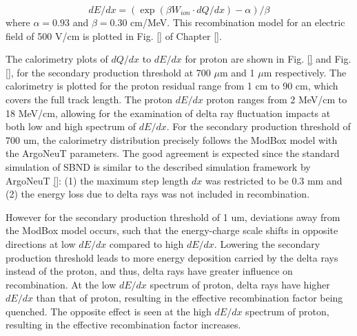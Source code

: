 \begin{equation}
	dE/dx = \left(\exp{\left(\beta W_{ion} \cdot dQ/dx \right)} -\alpha \right)/\beta
\end{equation}
where $\alpha = 0.93$ and $\beta = 0.30$ cm/MeV. 
This recombination model for an electric field of 500 V/cm is plotted in Fig. \ref{} of Chapter \ref{}.

The calorimetry plots of $dQ/dx$ to $dE/dx$ for proton are shown in Fig. \ref{} and Fig. \ref{}, for the secondary production threshold at 700 $\mu$m and 1 $\mu$m respectively.
The calorimetry is plotted for the proton residual range from 1 cm to 90 cm, which covers the full track length. 
The proton $dE/dx$ proton ranges from 2 MeV/cm to 18 MeV/cm, allowing for the examination of delta ray fluctuation impacts at both low and high spectrum of $dE/dx$. 
For the secondary production threshold of 700 um, the calorimetry distribution precisely follows the ModBox model with the ArgoNeuT parameters.
The good agreement is expected since the standard simulation of SBND is similar to the described simulation framework by ArgoNeuT \ref{}: (1) the maximum step length $dx$ was restricted to be 0.3 mm and (2) the energy loss due to delta rays was not included in recombination.

However for the secondary production threshold of 1 um, deviations away from the ModBox model occurs, such that the energy-charge scale shifts in opposite directions at low $dE/dx$ compared to high $dE/dx$. 
Lowering the secondary production threshold leads to more energy deposition carried by the delta rays instead of the proton, and thus, delta rays have greater influence on recombination.
At the low $dE/dx$ spectrum of proton, delta rays have higher $dE/dx$ than that of proton, resulting in the effective recombination factor being quenched. 
The opposite effect is seen at the high $dE/dx$ spectrum of proton, resulting in the effective recombination factor increases.
 
